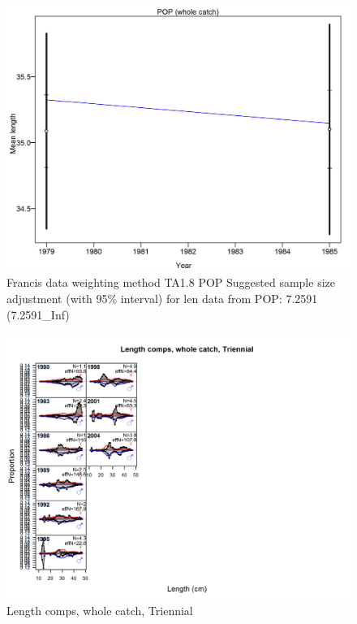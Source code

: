 \documentclass[12pt,]{article}
\begin{document}
\begin{figure}
\centering
\includegraphics{./r4ss/plots_mod1/comp_lenfit_data_weighting_TA1.8_POP.png}
\caption{Francis data weighting method TA1.8 POP Suggested sample size
adjustment (with 95\% interval) for len data from POP: 7.2591
(7.2591\_Inf) \label{fig:mod1_17_comp_lenfit_data_weighting_TA1.8_POP}}
\end{figure}

\begin{figure}
\centering
\includegraphics{./r4ss/plots_mod1/comp_lenfit_flt5mkt0.png}
\caption{Length comps, whole catch, Triennial
\label{fig:mod1_18_comp_lenfit_flt5mkt0}}
\end{figure}
\end{document}
